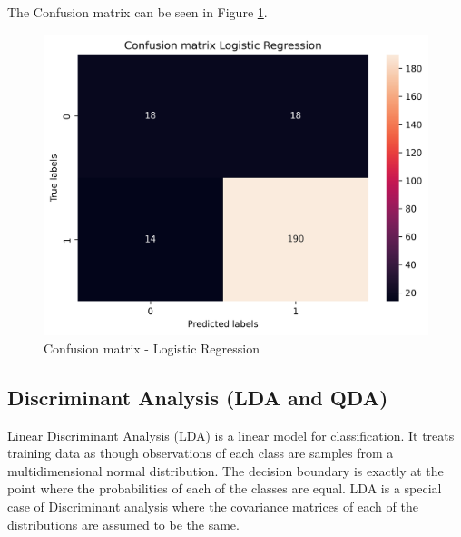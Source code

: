 \documentclass{article}
\begin{document}

The Confusion matrix can be seen in Figure \ref{fig:cmlg}.

\begin{figure}[H]
    \centering
    \includegraphics[width=0.5\linewidth]{Report/Images/confusion_matrix_marina_regression.png}
    \caption{Confusion matrix - Logistic Regression}
    \label{fig:cmlg}
\end{figure}


\subsection{Discriminant Analysis (LDA and QDA)}

Linear Discriminant Analysis (LDA) is a linear model for classification. It treats training data as though observations of each class are samples from a multidimensional normal distribution. The decision boundary is exactly at the point where the probabilities of each of the classes are equal. LDA is a special case of Discriminant analysis where the covariance matrices of each of the distributions are assumed to be the same.



\end{document}
